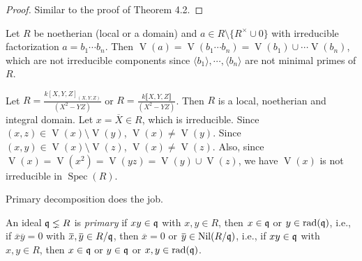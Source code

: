 \begin{proof}
    Similar to the proof of Theorem 4.2.
\end{proof}

\begin{discussion}
    Let $R$ be noetherian (local or a domain) and $a \in R \setminus \{R^{\times} \cup 0\}$ with irreducible factorization $a = b_1 \cdots b_n$. Then $\operatorname{V}(a) = \operatorname{V}(b_1 \cdots b_n) = \operatorname{V}(b_1) \cup \cdots \operatorname{V}(b_n)$, which are not irreducible components since $\langle b_1 \rangle, \cdots, \langle b_n \rangle$ are not minimal primes of $R$.
\end{discussion}

\begin{example}
    Let $R = \frac{k[X,Y,Z]_{(X,Y,Z)}}{(X^{2}-YZ)}$ or $R = \frac{k\llbracket X,Y,Z \rrbracket }{(X^{2}-YZ)}$. Then $R$ is a local, noetherian and integral domain. Let $x = \overbar{X} \in R$, which is irreducible. Since $(x,z) \in \operatorname{V}(x) \setminus \operatorname{V}(y)$, $\operatorname{V}(x) \neq \operatorname{V}(y)$. Since $(x,y) \in \operatorname{V}(x) \setminus \operatorname{V}(z)$, $\operatorname{V}(x) \neq \operatorname{V}(z)$. Also, since $\operatorname{V}(x) = \operatorname{V}(x^{2}) = \operatorname{V}(yz) = \operatorname{V}(y) \cup \operatorname{V}(z)$, we have $\operatorname{V}(x)$ is not irreducible in $\operatorname{Spec}(R)$. 

\end{example}

\noindent Primary decomposition does the job.

\begin{definition}
    An ideal $\mathfrak{q} \lneq R$ is \emph{primary} if $xy \in \mathfrak{q}$ with $x,y \in R$, then $x \in \mathfrak{q}$ or $y \in \operatorname{rad}(\mathfrak{q})$, i.e., if $\overbar{x} \overbar{y} = 0$ with $\overbar{x}, \overbar{y} \in R/\ffq$, then $\overbar{x} = 0$ or $\overbar{y} \in \operatorname{Nil}(R/\ffq)$, i.e., if $xy \in \mathfrak{q}$ with $x,y \in R$, then $x \in \mathfrak{q}$ or $y \in \mathfrak{q}$ or $x,y \in \operatorname{rad}(\mathfrak{q})$.
\end{definition}

